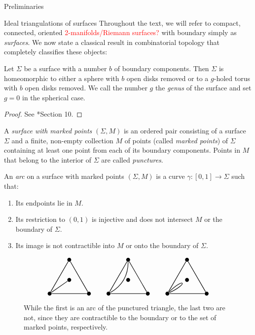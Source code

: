 \begin{chapter}{Preliminaries}
\begin{section}{Ideal triangulations of surfaces}
Throughout the text, we will refer to compact, connected, oriented \textcolor{red}{2-manifolds/Riemann surfaces?} with boundary simply as \emph{surfaces}. We now state a classical result in combinatorial topology that completely classifies these objects:

\begin{prop}\label{surf-classification} Let $\Sigma$ be a surface with a number $b$ of boundary components. Then $\Sigma$ is homeomorphic to either a sphere with $b$ open disks removed or to a $g$-holed torus with $b$ open disks removed. We call the number $g$ the \emph{genus} of the surface and set $g=0$ in the spherical case.
\end{prop}
\begin{proof} See \cite{Mas77}*{Section 10}.
\end{proof}

A \emph{surface with marked points} $(\Sigma,M)$ is an ordered pair consisting of a surface $\Sigma$ and a finite, non-empty collection $M$ of points (called \emph{marked points}) of $\Sigma$ containing at least one point from each of its boundary components. Points in $M$ that belong to the interior of $\Sigma$ are called \emph{punctures}.

An \emph{arc} on a surface with marked points $(\Sigma, M)$ is a curve $\gamma:[0,1]\to \Sigma$ such that:
\begin{enumerate}
\item Its endpoints lie in $M$.
\item Its restriction to $(0,1)$ is injective and does not intersect $M$ or the boundary of $\Sigma$.
\item Its image is not contractible into $M$ or onto the boundary of $\Sigma$.
\end{enumerate}
\begin{figure}[h]
\[
\begin{tikzpicture}[thick]
\tikzstyle{every node} = [circle, fill=black, minimum size=.2cm, inner sep=0cm]
\node (se1) at (0,0) {};
\node (sw1) at (2,0) {}
	edge (se1);
\node (n1) at (1,1.73) {}
	edge (se1)
	edge (sw1);
\node (c1) at (1,0.7) {}
	edge (se1);

\node (se2) at (3,0) {};
\node (sw2) at (5,0) {}
	edge (se2);
\node (n2) at (4,1.73) {}
	edge (se2)
	edge (sw2)
	edge [bend left] (se2);
\node (c2) at (4,0.7) {};

\node (se3) at (6,0) {}
	edge [in=25, out=45, distance=1.1cm] (se3);
\node (sw3) at (8,0) {}
	edge (se3);
\node (n3) at (7,1.73) {}
	edge (se3)
	edge (sw3);
\node (c3) at (7,0.7) {};
\end{tikzpicture}
\]
\caption{While the first is an arc of the punctured triangle, the last two are not, since they are contractible to the boundary or to the set of marked points, respectively.}
\end{figure}


\end{section}
\end{chapter}
